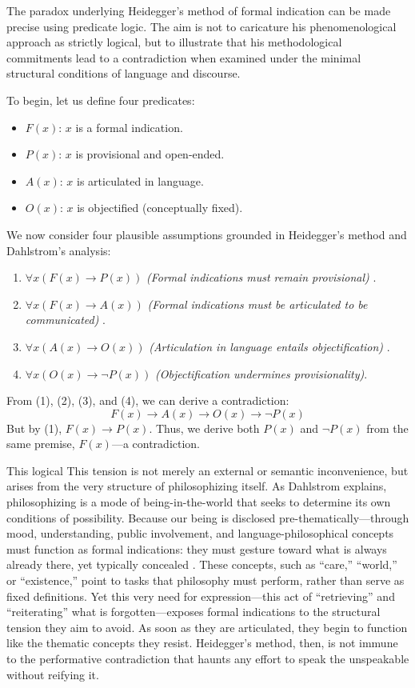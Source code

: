 \documentclass{article}
\begin{document}
The paradox underlying Heidegger’s method of formal indication can be made precise using predicate logic. The aim is not to caricature his phenomenological approach as strictly logical, but to illustrate that his methodological commitments lead to a contradiction when examined under the minimal structural conditions of language and discourse.

To begin, let us define four predicates:
\begin{itemize}
  \item $F(x)$: $x$ is a formal indication.
  \item $P(x)$: $x$ is provisional and open-ended.
  \item $A(x)$: $x$ is articulated in language.
  \item $O(x)$: $x$ is objectified (conceptually fixed).
\end{itemize}

We now consider four plausible assumptions grounded in Heidegger’s method and Dahlstrom’s analysis:

\begin{enumerate}
  \item $\forall x (F(x) \rightarrow P(x))$ \hfill \textit{(Formal indications must remain provisional)} \parencite[pp.~781–782]{dahlstrom1994}.
  \item $\forall x (F(x) \rightarrow A(x))$ \hfill \textit{(Formal indications must be articulated to be communicated)} \parencite[p.~781]{dahlstrom1994}.
  \item $\forall x (A(x) \rightarrow O(x))$ \hfill \textit{(Articulation in language entails objectification)} \parencite[p.~783]{dahlstrom1994}.
  \item $\forall x (O(x) \rightarrow \neg P(x))$ \hfill \textit{(Objectification undermines provisionality)}.
\end{enumerate}

From (1), (2), (3), and (4), we can derive a contradiction:
\[
F(x) \rightarrow A(x) \rightarrow O(x) \rightarrow \neg P(x)
\]
But by (1), $F(x) \rightarrow P(x)$. Thus, we derive both $P(x)$ and $\neg P(x)$ from the same premise, $F(x)$—a contradiction.

This logical This tension is not merely an external or semantic inconvenience, but arises from the very structure of philosophizing itself. As Dahlstrom explains, philosophizing is a mode of being-in-the-world that seeks to determine its own conditions of possibility. Because our being is disclosed pre-thematically—through mood, understanding, public involvement, and language-philosophical concepts must function as formal indications: they must gesture toward what is always already there, yet typically concealed \parencite[pp.~789-790]{dahlstrom1994}. These concepts, such as “care,” “world,” or “existence,” point to tasks that philosophy must perform, rather than serve as fixed definitions. Yet this very need for expression—this act of “retrieving” and “reiterating” what is forgotten—exposes formal indications to the structural tension they aim to avoid. As soon as they are articulated, they begin to function like the thematic concepts they resist. Heidegger’s method, then, is not immune to the performative contradiction that haunts any effort to speak the unspeakable without reifying it.
\end{document}
